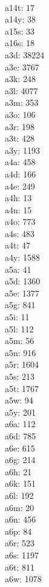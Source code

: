 \begin{multicols}{8}
  \\ a14t: 17
  \\ a14y: 38
  \\ a15s: 33
  \\ a16s: 18
  \\ a3d: 38224
  \\ a3e: 3767
  \\ a3k: 248
  \\ a3l: 4077
  \\ a3m: 353
  \\ a3o: 106
  \\ a3r: 198
  \\ a3t: 428
  \\ a3y: 1193
  \\ a4a: 458
  \\ a4d: 166
  \\ a4e: 249
  \\ a4h: 13
  \\ a4n: 15
  \\ a4o: 773
  \\ a4s: 483
  \\ a4t: 47
  \\ a4y: 1588
  \\ a5a: 41
  \\ a5d: 1360
  \\ a5e: 1377
  \\ a5g: 841
  \\ a5i: 11
  \\ a5l: 112
  \\ a5m: 56
  \\ a5n: 916
  \\ a5r: 1604
  \\ a5s: 213
  \\ a5t: 1767
  \\ a5w: 94
  \\ a5y: 201
  \\ a6a: 112
  \\ a6d: 785
  \\ a6e: 615
  \\ a6g: 214
  \\ a6h: 21
  \\ a6k: 151
  \\ a6l: 192
  \\ a6m: 20
  \\ a6n: 456
  \\ a6p: 84
  \\ a6r: 523
  \\ a6s: 1197
  \\ a6t: 811
  \\ a6w: 1078

\end{multicols}
